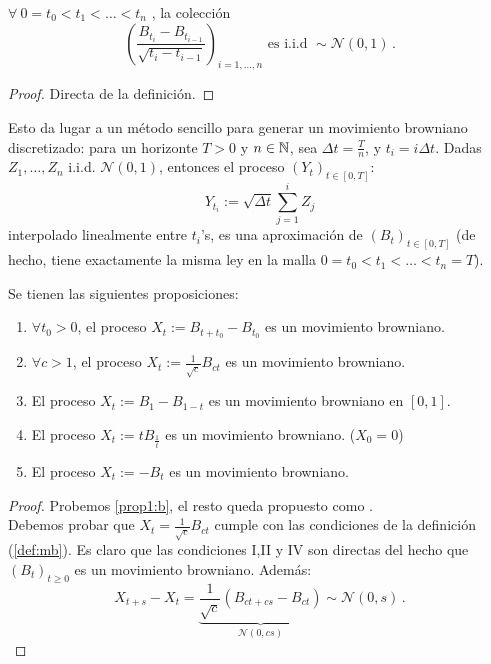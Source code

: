 \begin{proposition}
$\forall ~ 0 = t_0 < t_1 < \ldots < t_n$ , la colección 
\begin{equation*}
    \left( \frac{B_{t_i} - B_{t_{i-1}}}{\sqrt{t_i - t_{i-1}} }
    \right)_{i = 1, \ldots,n} \text{ es i.i.d } \sim \mathcal{N}(0,1)\,.
\end{equation*}
\end{proposition}
\begin{proof}
\gris
Directa de la definición.
\negro
\end{proof}

Esto da lugar a un método sencillo para generar un movimiento browniano discretizado: para un horizonte $T > 0$ y $n \in \mathbb{N}$, sea $\Delta t = \frac{T}{n}$, y $t_i = i \Delta t$.  Dadas $Z_1, \ldots, Z_n$ i.i.d. $\mathcal{N}(0,1)$, entonces el proceso $(Y_{t})_{t \in [0,T]}$: 
\begin{equation*}
    Y_{t_i} := \sqrt{\Delta t} \sum_{j=1}^{i} Z_j
\end{equation*}
interpolado linealmente entre $t_i$'s, es una aproximación de $(B_t)_{t \in [0,T]}$ (de hecho, tiene exactamente la misma ley en la malla $0 = t_0 < t_1 < \ldots < t_n = T$). 

\begin{proposition}
Se tienen las siguientes proposiciones:
\begin{enumerate}
    \item \label{prop1:a} $\forall  t_0 > 0$, el proceso $X_t := B_{t + t_0} - B_{t_0}$ es un movimiento browniano.
    \item \label{prop1:b} $\forall c > 1$, el proceso $X_t := \frac{1}{\sqrt{c}} B_{ct}$ es un movimiento browniano.
    \item \label{prop1:c} El proceso $X_t := B_1 - B_{1-t}$ es un movimiento browniano en $[0,1]$.
    \item \label{prop1:d} El proceso $X_t := t B_{\frac{1}{t}}$ es un movimiento browniano. ($X_0 = 0$)
    \item \label{prop1:e} El proceso $X_t := -B_{t}$ es un movimiento browniano.
\end{enumerate}
\end{proposition}

\begin{proof}
\gris
Probemos \ref{prop1:b}, el resto queda propuesto como \ejercicio.
\\ \gris Debemos probar que $X_t = \frac{1}{\sqrt{c}} B_{ct}$ cumple con las condiciones de la definición (\ref{def:mb}). Es claro  que las condiciones I,II y IV son directas del hecho que $(B_t)_{t \geq 0}$ es un movimiento browniano. Además: 
\begin{equation*}
    X_{t+s} - X_t = \underbrace{\frac{1}{\sqrt{c} } \left( B_{ct + cs} - B_{ct} \right)}_{\mathcal{N}(0,cs)} \sim  \mathcal{N}(0,s)\,.
\end{equation*}
\findem
\negro
\end{proof}

